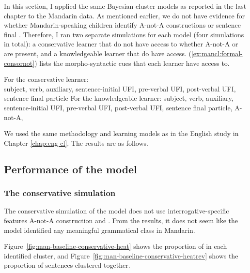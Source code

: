 In this section, I applied the same Bayesian cluster models as reported in the last chapter to the Mandarin data. As mentioned earlier, we do not have evidence for whether Mandarin-speaking children identify A-not-A constructions or sentence final . Therefore, I ran two separate simulations for each model (four simulations in total): a conservative learner that do not have access to whether A-not-A or  are present, and a knowledgeable learner that do have access. (\ref{ex:mancl:formal-consornot}) lists the morpho-syntactic cues that each learner have access to.

For the conservative learner: \\
\textpm subject, \textpm verb, \textpm auxiliary, \textpm sentence-initial UFI, \textpm pre-verbal UFI,  \textpm post-verbal UFI, \textpm sentence final particle
\ex For the knowledgeable learner:
\textpm subject, \textpm verb, \textpm auxiliary, \textpm sentence-initial UFI, \textpm pre-verbal UFI,  \textpm post-verbal UFI, \textpm sentence final particle, \textpm A-not-A, \textpm {}
\eex

We used the same methodology and learning models as in the English study in Chapter \ref{chap:eng-cl}. The results are as follows.

\subsection{Performance of the \dlearnerabbr{} model}
\label{sec:mancl:model:results:d}


\subsubsection{The conservative simulation} 
The conservative simulation of the \dlearnerabbr{} model does not use interrogative-specific features \textpm A-not-A construction and \textpm {}. From the results, it does not seem like the model identified any meaningful grammatical class in Mandarin.

Figure~\ref{fig:man-baseline-conservative-heat} shows the proportion of \diis{} in each identified cluster, and Figure~\ref{fig:man-baseline-conservative-heatrev} shows the proportion of sentences clustered together. 



